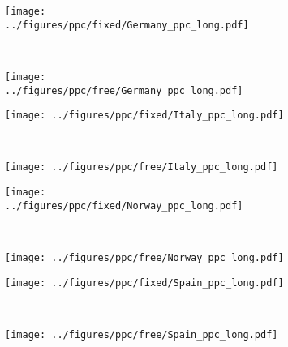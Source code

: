 \documentclass[12pt]{extarticle}
\begin{document}
\begin{figure}
    \ContinuedFloat 
    \begin{subfigure}{0.45\textwidth}
        \texttt{[image: ../figures/ppc/fixed/Germany\_ppc\_long.pdf]}
    \end{subfigure}
    ~
    \begin{subfigure}{0.45\textwidth}
        \texttt{[image: ../figures/ppc/free/Germany\_ppc\_long.pdf]}
    \end{subfigure}
    \begin{subfigure}{0.45\textwidth}
        \texttt{[image: ../figures/ppc/fixed/Italy\_ppc\_long.pdf]}
    \end{subfigure}
    ~
    \begin{subfigure}{0.45\textwidth}
        \texttt{[image: ../figures/ppc/free/Italy\_ppc\_long.pdf]}
    \end{subfigure}
    \begin{subfigure}{0.45\textwidth}
        \texttt{[image: ../figures/ppc/fixed/Norway\_ppc\_long.pdf]}
    \end{subfigure}
    ~
    \begin{subfigure}{0.45\textwidth}
        \texttt{[image: ../figures/ppc/free/Norway\_ppc\_long.pdf]}
    \end{subfigure}
    \begin{subfigure}{0.45\textwidth}
        \texttt{[image: ../figures/ppc/fixed/Spain\_ppc\_long.pdf]}
    \end{subfigure}
    ~
    \begin{subfigure}{0.45\textwidth}
        \texttt{[image: ../figures/ppc/free/Spain\_ppc\_long.pdf]}
    \end{subfigure}
\end{figure}
\end{document}
